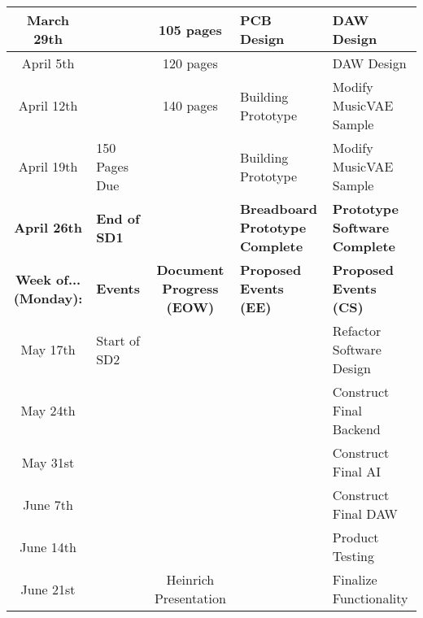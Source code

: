 \begin{table}[h!]
{\begin{tabular}{|S|L|S|L|L|}
      March 29th                    &                       & 105 pages                        & PCB Design                             & DAW Design                           \\ \hline
      April 5th                     &                       & 120 pages                        &                                        & DAW Design                           \\ \hline
      April 12th                    &                       & 140 pages                        & Building Prototype                     & Modify MusicVAE Sample               \\ \hline
      April 19th                    & 150 Pages Due         &                                  & Building Prototype                     & Modify MusicVAE Sample               \\ \hline
      \textbf{April 26th}           & \textbf{End of SD1}   & \textbf{}                        & \textbf{Breadboard Prototype Complete} & \textbf{Prototype Software Complete} \\ \hline
      \textbf{Week of... (Monday):} & \textbf{Events}       & \textbf{Document Progress (EOW)} & \textbf{Proposed Events (EE)}          & \textbf{Proposed Events (CS)}        \\ \hline
      May 17th                      & Start of SD2          &                                  &                                        & Refactor Software Design             \\ \hline
      May 24th                      &                       &                                  &                                        & Construct Final Backend              \\ \hline
      May 31st                      &                       &                                  &                                        & Construct Final AI                   \\ \hline
      June 7th                      &                       &                                  &                                        & Construct Final DAW                  \\ \hline
      June 14th                     &                       &                                  &                                        & Product Testing                      \\ \hline
      June 21st                     &                       & Heinrich Presentation            &                                        & Finalize Functionality               \\ \hline

\end{tabular}}
\end{table}
